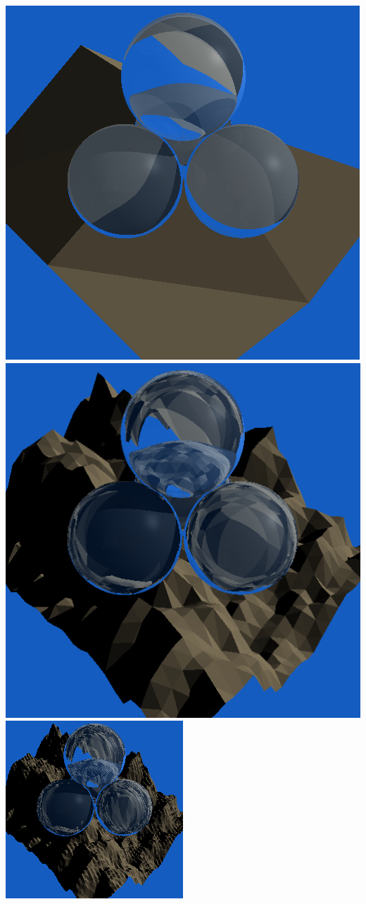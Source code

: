 \documentclass{article}
\begin{document}
        \begin{center}
            \includegraphics[scale=0.27]{mount_low}
            \includegraphics[scale=0.27]{mount_med} 
            \includegraphics[scale=0.54]{mount_high} 
        \end{center}
	
\end{document}
